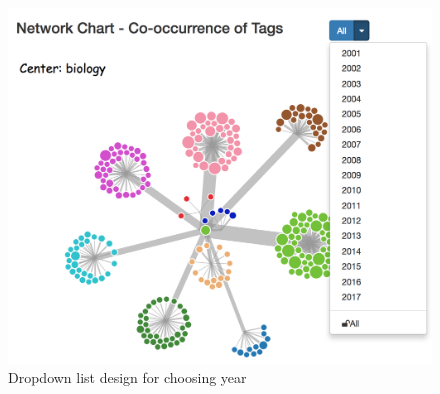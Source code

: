 \documentclass{report}
\numberwithin{figure}{section}
\begin{document}
\begin{figure}
\begin{center}
\includegraphics[scale=0.32]{yeardropdown}
\caption{Dropdown list design for choosing year}
\label{fig:yeardropdown}
\end{center}
\end{figure}
\end{document}
